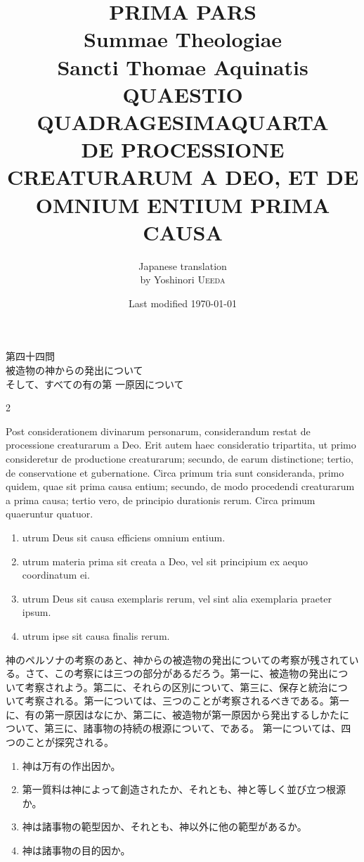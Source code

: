 \documentclass[paper=a4paper,fontsize=10pt,jafontsize=9pt,titlepage]{jlreq}
\title{{\bfseries PRIMA PARS}\\{\Huge Summae Theologiae}\\Sancti Thomae
Aquinatis\\{\sffamily QUAESTIO QUADRAGESIMAQUARTA}\\DE PROCESSIONE
CREATURARUM A DEO, ET DE OMNIUM ENTIUM PRIMA CAUSA}
\author{Japanese translation\\by Yoshinori {\scshape Ueeda}}
\date{Last modified \today}
\begin{document}
\maketitle

\begin{center}
{\Large 第四十四問\\被造物の神からの発出について\\そして、すべての有の第
 一原因について}
\end{center}

\begin{paracol}{2}

Post considerationem divinarum personarum, considerandum restat de
 processione creaturarum a Deo. Erit autem haec consideratio tripartita,
 ut primo consideretur de productione creaturarum; secundo, de earum
 distinctione; tertio, de conservatione et gubernatione. Circa primum
 tria sunt consideranda, primo quidem, quae sit prima causa entium;
 secundo, de modo procedendi creaturarum a prima causa; tertio vero, de
 principio durationis rerum. Circa primum quaeruntur quatuor. 

\begin{enumerate}
 \item utrum Deus sit causa efficiens omnium entium.
 \item utrum materia
 prima sit creata a Deo, vel sit principium ex aequo coordinatum
 ei.
 \item utrum Deus sit causa exemplaris rerum, vel sint alia
 exemplaria praeter ipsum.
 \item utrum ipse sit causa finalis rerum.
\end{enumerate}

\switchcolumn

神のペルソナの考察のあと、神からの被造物の発出についての考察が残されてい
 る。さて、この考察には三つの部分があるだろう。第一に、被造物の発出につ
 いて考察されよう。第二に、それらの区別について、第三に、保存と統治につ
 いて考察される。第一については、三つのことが考察されるべきである。第一
 に、有の第一原因はなにか、第二に、被造物が第一原因から発出するしかたに
 ついて、第三に、諸事物の持続の根源について、である。
第一については、四つのことが探究される。
\begin{enumerate}
 \item 神は万有の作出因か。
 \item 第一質料は神によって創造されたか、それとも、神と等しく並び立つ根源
 か。
 \item 神は諸事物の範型因か、それとも、神以外に他の範型があるか。
 \item 神は諸事物の目的因か。
\end{enumerate}

\end{paracol}
\end{document}
